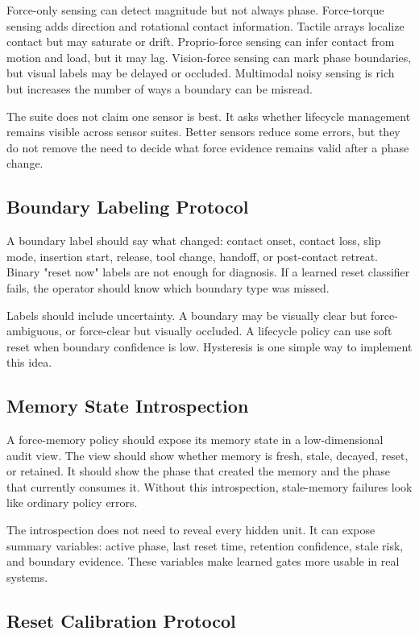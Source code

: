 \documentclass{article}
\begin{document}
Force-only sensing can detect magnitude but not always phase. Force-torque
sensing adds direction and rotational contact information. Tactile arrays
localize contact but may saturate or drift. Proprio-force sensing can infer
contact from motion and load, but it may lag. Vision-force sensing can mark
phase boundaries, but visual labels may be delayed or occluded. Multimodal
noisy sensing is rich but increases the number of ways a boundary can be
misread.

The suite does not claim one sensor is best. It asks whether lifecycle
management remains visible across sensor suites. Better sensors reduce some
errors, but they do not remove the need to decide what force evidence remains
valid after a phase change.

\subsection{Boundary Labeling Protocol}

A boundary label should say what changed: contact onset, contact loss, slip
mode, insertion start, release, tool change, handoff, or post-contact retreat.
Binary "reset now" labels are not enough for diagnosis. If a learned reset
classifier fails, the operator should know which boundary type was missed.

Labels should include uncertainty. A boundary may be visually clear but
force-ambiguous, or force-clear but visually occluded. A lifecycle policy can
use soft reset when boundary confidence is low. Hysteresis is one simple way to
implement this idea.

\subsection{Memory State Introspection}

A force-memory policy should expose its memory state in a low-dimensional audit
view. The view should show whether memory is fresh, stale, decayed, reset, or
retained. It should show the phase that created the memory and the phase that
currently consumes it. Without this introspection, stale-memory failures look
like ordinary policy errors.

The introspection does not need to reveal every hidden unit. It can expose
summary variables: active phase, last reset time, retention confidence, stale
risk, and boundary evidence. These variables make learned gates more usable in
real systems.

\subsection{Reset Calibration Protocol}
\end{document}
